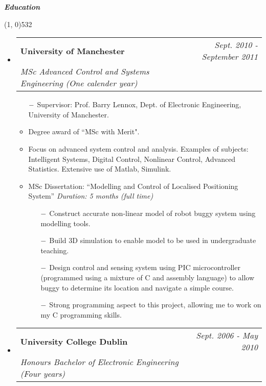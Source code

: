 \documentclass[a4,11pt]{article}
\makeatletter
\newcommand{\resheading}[1]{\large \colorbox{mycolour}{\begin{minipage}{\textwidth}{\textbf{#1 \vphantom{p\^{E}}}}\end{minipage}}}
\newcommand{\ressubheading}[4]{
\begin{tabular*}{7.0in}{l@{\extracolsep{\fill}}r}
		\textbf{#1} & \textit{#2} \\
		\textit{#3} & \textit{#4} \\
\end{tabular*}\vspace{-5pt}}
\makeatother
\begin{document}
\vspace{-10mm}

\resheading{\textit{Education}\vspace{-5mm}}
\line(1, 0){532}
 \vspace{-0.07in}
\begin{itemize}

\item
	\ressubheading{University of Manchester}{Sept. 2010 - September 2011}{MSc Advanced Control and Systems Engineering (One calender year)}{}
	\begin{itemize}	
	 \item[$\--$]{Supervisor: \hspace{-3mm} Prof. \hspace{-2.5mm} Barry Lennox, Dept.  \hspace{-2.5mm}  of Electronic Engineering,  University of Manchester.}
	\item{Degree award of ``MSc with Merit".}
	\item Focus on advanced system control and analysis. Examples of subjects: Intelligent Systems, Digital Control, Nonlinear Control, Advanced Statistics. Extensive use of Matlab, Simulink.
	\item{MSc Dissertation: ``Modelling and Control of Localised Positioning System''  \emph{Duration: 5 months (full time)}}
	\begin{itemize}
	\item[$\--$]{Construct accurate non-linear model of robot buggy system using modelling tools.}
	\item[$\--$]{Build 3D simulation to enable model to be used in undergraduate teaching.}
	\item[$\--$]{Design control and sensing system using PIC microcontroller (programmed using a mixture of C  and assembly language) to allow buggy to determine its location and navigate a simple course.}
	\item[$\--$]{Strong programming aspect to this project, allowing me to work on my C programming skills.}	
	\end{itemize}
	\end{itemize}	
\item
	\ressubheading{University College Dublin}{Sept. 2006 - May 2010}{Honours Bachelor of Electronic Engineering (Four years)}{}
	\begin{itemize}

\end{itemize}
\end{itemize}
\end{document}
